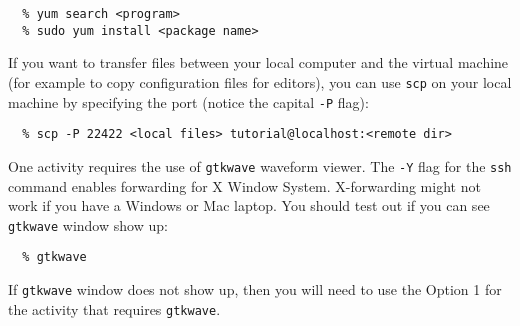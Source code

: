 \documentclass[11pt]{article}
\begin{document}
\begin{verbatim}
  % yum search <program>
  % sudo yum install <package name>
\end{verbatim}

If you want to transfer files between your local computer and the virtual
machine (for example to copy configuration files for editors), you can use
\texttt{scp} on your local machine by specifying the port (notice the
capital \texttt{-P} flag):

\begin{verbatim}
  % scp -P 22422 <local files> tutorial@localhost:<remote dir>
\end{verbatim}

One activity requires the use of \texttt{gtkwave} waveform viewer. The
\texttt{-Y} flag for the \texttt{ssh} command enables forwarding for X
Window System. X-forwarding might not work if you have a Windows or Mac
laptop. You should test out if you can see \texttt{gtkwave} window show
up:

\begin{verbatim}
  % gtkwave
\end{verbatim}

If \texttt{gtkwave} window does not show up, then you will need to use the
Option 1 for the activity that requires \texttt{gtkwave}.
\end{document}
